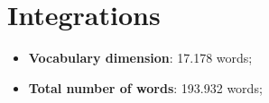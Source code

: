\section{Integrations}

\begin{itemize}
	\item \textbf{Vocabulary dimension}: 17.178 words;
	\item \textbf{Total number of words}: 193.932 words;
\end{itemize}
